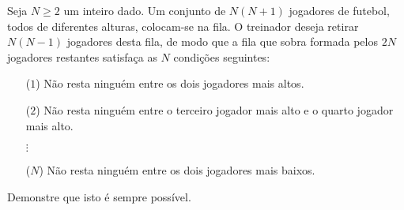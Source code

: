 Seja $N \ge 2$ um inteiro dado. Um conjunto de $N(N + 1)$ jogadores de futebol, todos de diferentes alturas, colocam-se na fila. O treinador deseja retirar $N(N - 1)$ jogadores desta fila, de modo que a fila que sobra formada pelos $2N$ jogadores restantes satisfaça as $N$ condições seguintes:
\begin{itemize}
	\item[($1$)] Não resta ninguém entre os dois jogadores mais altos.
	\item[($2$)] Não resta ninguém entre o terceiro jogador mais alto e o quarto jogador mais alto.
	\item[$\vdots$]
	\item[($N$)] Não resta ninguém entre os dois jogadores mais baixos.
\end{itemize}

Demonstre que isto é sempre possível.
